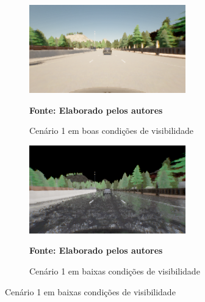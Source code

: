 \documentclass[a4paper,12pt,Times]{article}
\begin{document}
\begin{figure}[H]
\caption{Imagens do cenário 1 gerada pelo ANTI-CARLA}
\centering
\begin{subfigure}{0.45\textwidth}
    \centering
    \includegraphics[scale=0.77]{figuras/simulação-boa-1.png}
    \captionsetup{justification=centering}
    \caption{Cenário 1 em boas condições de visibilidade}
    \label{fig:boa-1}
    \vspace{-0.2cm}
    \textbf{\footnotesize Fonte: Elaborado pelos autores}
\end{subfigure}
\hfill
\begin{subfigure}{0.45\textwidth}
    \centering
    \includegraphics[scale=0.77]{figuras/simulação-ruim-1.png}
    \captionsetup{justification=centering}
    \caption{Cenário 1 em baixas condições de visibilidade}
    \label{fig:ruim-1}
    \vspace{-0.2cm}
    \textbf{\footnotesize Fonte: Elaborado pelos autores}
\end{subfigure}

\end{figure}
\end{document}
